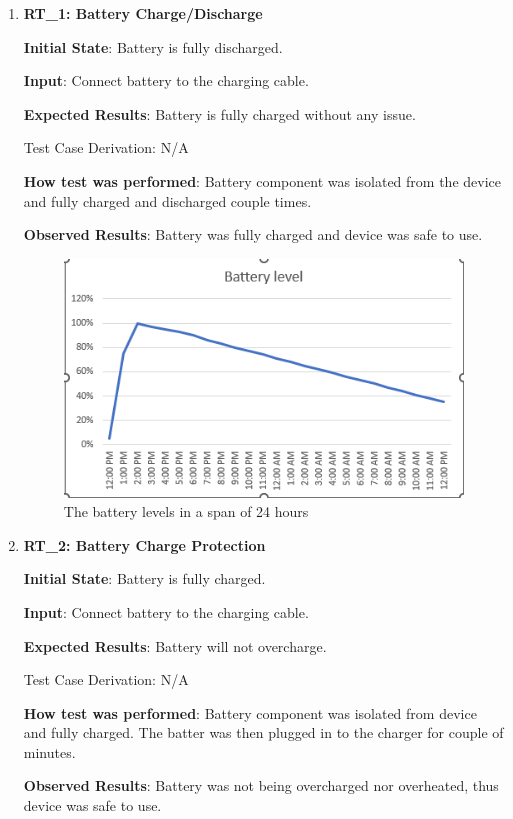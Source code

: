 \documentclass[12pt, titlepage]{article}
\begin{document}
\begin{enumerate}


  \item{\textbf{RT\_1: Battery Charge/Discharge}}\label{RT1}

  \textbf{Initial State}: Battery is fully discharged.

  \textbf{Input}: Connect battery to the charging cable.

  \textbf{Expected Results}: Battery is fully charged without any issue.

  Test Case Derivation: N/A

  \textbf{How test was performed}: Battery component was isolated from the device and fully charged and discharged couple times.

  \textbf{Observed Results}: Battery was fully charged and device was safe to use.\\
\begin{figure}
\centering
  \includegraphics{battery_level}
	\caption{The battery levels in a span of 24 hours}
\label{fig:battery_level}
\end{figure}
  \item{\textbf{RT\_2: Battery Charge Protection}}\label{RT2}

  \textbf{Initial State}: Battery is fully charged.

  \textbf{Input}: Connect battery to the charging cable.

  \textbf{Expected Results}: Battery will not overcharge.

  Test Case Derivation: N/A

  \textbf{How test was performed}: Battery component was isolated from device and fully charged. The batter was then plugged in to the charger for couple of minutes.

  \textbf{Observed Results}: Battery was not being overcharged nor overheated, thus device was safe to use.

\end{enumerate}
\end{document}
